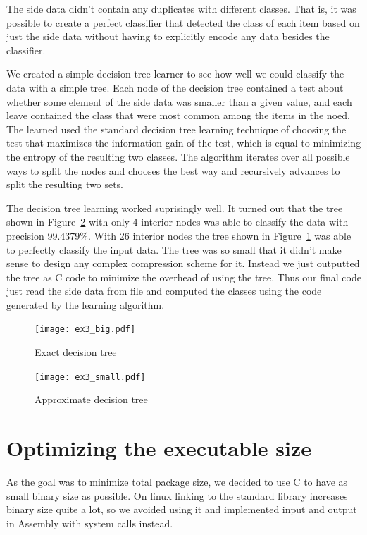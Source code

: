 \documentclass{article}
\begin{document}
The side data didn't contain any duplicates with different classes.
That is, it was possible to create a perfect classifier that detected the class of each item based on just the side data without having to explicitly encode any data besides the classifier.

We created a simple decision tree learner to see how well we could classify the data with a simple tree.
Each node of the decision tree contained a test about whether some element of the side data was smaller than a given value, and each leave contained the class that were most common among the items in the noed.
The learned used the standard decision tree learning technique of choosing the test that maximizes the information gain of the test, which is equal to minimizing the entropy of the resulting two classes.
The algorithm iterates over all possible ways to split the nodes and chooses the best way and recursively advances to split the resulting two sets.

The decision tree learning worked suprisingly well.
It turned out that the tree shown in Figure~\ref{fig:ex3small} with only 4 interior nodes was able to classify the data with precision 99.4379\%.
With 26 interior nodes the tree shown in Figure~\ref{fig:ex3big} was able to perfectly classify the input data.
The tree was so small that it didn't make sense to design any complex compression scheme for it.
Instead we just outputted the tree as C code to minimize the overhead of using the tree.
Thus our final code just read the side data from file and computed the classes using the code generated by the learning algorithm.

\begin{figure}
	\centerline{\texttt{[image: ex3\_big.pdf]}}
    \caption{Exact decision tree}\label{fig:ex3big}
\end{figure}

\begin{figure}
    \begin{center}
	\texttt{[image: ex3\_small.pdf]}
    \end{center}
    \caption{Approximate decision tree}\label{fig:ex3small}
\end{figure}

\section{Optimizing the executable size}

As the goal was to minimize total package size, we decided to use C to have as small binary size as possible.
On linux linking to the standard library increases binary size quite a lot, so we avoided using it and implemented input and output in Assembly with system calls instead.




%

\end{document}
